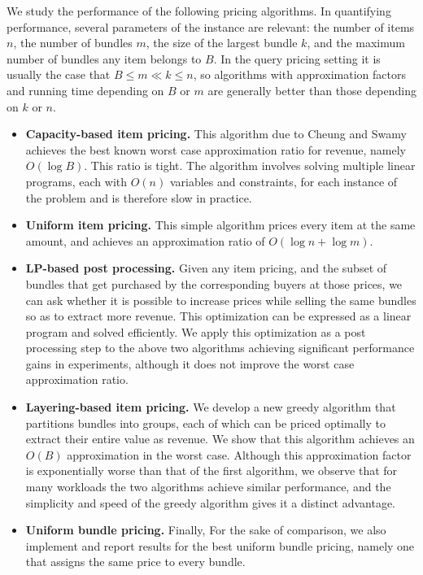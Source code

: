 We study the performance of the following pricing algorithms. In quantifying performance, several parameters of the instance are relevant: the number of items $n$, the number of bundles $m$, the size of the largest bundle $k$, and the maximum number of bundles any item belongs to $B$. In the query pricing setting it is usually the case that $B\le m\ll k\le n$, so algorithms with approximation factors and running time depending on $B$ or $m$ are generally better than those depending on $k$ or $n$.
\begin{itemize}
\item {\bf Capacity-based item pricing.} This algorithm due to Cheung and Swamy~\cite{cheung2008approximation} achieves the best known worst case approximation ratio for revenue, namely $O(\log B)$. This ratio is tight. The algorithm involves solving multiple linear programs, each with $O(n)$ variables and constraints, for each instance of the problem and is therefore slow in practice.
\item {\bf Uniform item pricing.} This simple algorithm prices every item at the same amount, and achieves an approximation ratio of $O(\log n+\log m)$. 
\item {\bf LP-based post processing.} Given any item pricing, and the subset of bundles that get purchased by the corresponding buyers at those prices, we can ask whether it is possible to increase prices while selling the same bundles so as to extract more revenue. This optimization can be expressed as a linear program and solved efficiently. We apply this optimization as a post processing step to the above two algorithms achieving significant performance gains in experiments, although it does not improve the worst case approximation ratio.
\item {\bf Layering-based item pricing.} We develop a new greedy algorithm that partitions bundles into groups, each of which can be priced optimally to extract their entire value as revenue. We show that this algorithm achieves an $O(B)$ approximation in the worst case. Although this approximation factor is exponentially worse than that of the first algorithm, we observe that for many workloads the two algorithms achieve similar performance, and the simplicity and speed of the greedy algorithm gives it a distinct advantage. 
\item {\bf Uniform bundle pricing.} Finally, For the sake of comparison, we also implement and report results for the best uniform bundle pricing, namely one that assigns the same price to every bundle.
\end{itemize}


